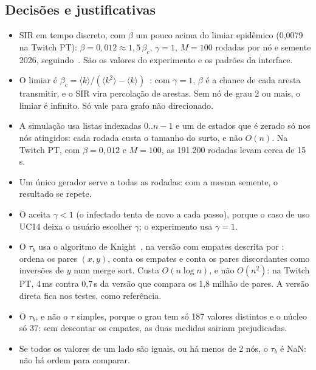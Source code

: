 \subsection{Decisões e justificativas}
\begin{itemize}[leftmargin=*]
  \item SIR em tempo discreto, com $\beta$ um pouco acima do limiar epidêmico (0,0079 na Twitch PT):
        $\beta = 0{,}012 \approx 1{,}5\,\beta_c$, $\gamma = 1$, $M = 100$ rodadas por nó e semente
        2026, seguindo~\cite{kitsak2010}. São os valores do experimento e os padrões da interface.
  \item O limiar é $\beta_c = \langle k \rangle / (\langle k^2 \rangle - \langle k \rangle)$~\cite{newman2002}:
        com $\gamma = 1$, $\beta$ é a chance de cada aresta transmitir, e o SIR vira percolação de
        arestas. Sem nó de grau 2 ou mais, o limiar é infinito. Só vale para grafo não direcionado.
  \item A simulação usa listas indexadas $0..n-1$ e um  de estados que é zerado só
        nos nós atingidos: cada rodada custa o tamanho do surto, e não $O(n)$. Na Twitch PT, com
        $\beta = 0{,}012$ e $M = 100$, as 191.200 rodadas levam cerca de 15\,s.
  \item Um único gerador  serve a todas as rodadas: com a mesma
        semente, o resultado se repete.
  \item O  aceita $\gamma < 1$ (o infectado tenta de novo a cada passo), porque
        o caso de uso UC14 deixa o usuário escolher $\gamma$; o experimento usa $\gamma = 1$.
  \item O $\tau_b$ usa o algoritmo de Knight~\cite{knight1966}, na versão com empates descrita por
        \cite{christensen2005}: ordena os pares $(x, y)$, conta os empates e conta os pares
        discordantes como inversões de $y$ num merge sort. Custa $O(n \log n)$, e não $O(n^2)$:
        na Twitch PT, 4\,ms contra 0,7\,s da versão que compara os 1,8 milhão de pares. A versão
        direta fica nos testes, como referência.
  \item O $\tau_b$, e não o $\tau$ simples, porque o grau tem só 187 valores distintos e o núcleo só
        37: sem descontar os empates, as duas medidas sairiam prejudicadas.
  \item Se todos os valores de um lado são iguais, ou há menos de 2 nós, o $\tau_b$ é NaN: não há
        ordem para comparar.
\end{itemize}

